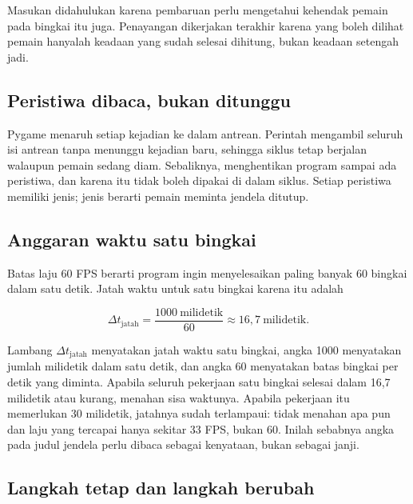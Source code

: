 \begin{center}

\end{center}

Masukan didahulukan karena pembaruan perlu mengetahui kehendak pemain pada
bingkai itu juga. Penayangan dikerjakan terakhir karena yang boleh dilihat
pemain hanyalah keadaan yang sudah selesai dihitung, bukan keadaan setengah
jadi.

\subsection*{Peristiwa dibaca, bukan ditunggu}

Pygame menaruh setiap kejadian ke dalam antrean. Perintah
 mengambil seluruh isi antrean tanpa menunggu kejadian
baru, sehingga siklus tetap berjalan walaupun pemain sedang diam. Sebaliknya,
 menghentikan program sampai ada peristiwa, dan
karena itu tidak boleh dipakai di dalam siklus. Setiap peristiwa memiliki jenis;
jenis  berarti pemain meminta jendela ditutup.

\subsection*{Anggaran waktu satu bingkai}

Batas laju 60 FPS berarti program ingin menyelesaikan paling banyak 60 bingkai
dalam satu detik. Jatah waktu untuk satu bingkai karena itu adalah

\[
\Delta t_{\text{jatah}} = \frac{1000\ \text{milidetik}}{60}
\approx 16{,}7\ \text{milidetik}.
\]

Lambang $\Delta t_{\text{jatah}}$ menyatakan jatah waktu satu bingkai, angka
1000 menyatakan jumlah milidetik dalam satu detik, dan angka 60 menyatakan
batas bingkai per detik yang diminta. Apabila seluruh pekerjaan satu bingkai
selesai dalam 16,7 milidetik atau kurang,  menahan sisa
waktunya. Apabila pekerjaan itu memerlukan 30 milidetik, jatahnya sudah
terlampaui:  tidak menahan apa pun dan laju yang tercapai hanya
sekitar 33 FPS, bukan 60. Inilah sebabnya angka pada judul jendela perlu
dibaca sebagai kenyataan, bukan sebagai janji.

\subsection*{Langkah tetap dan langkah berubah}


